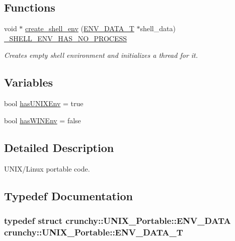 \subsection*{Functions}
\begin{DoxyCompactItemize}
\item 
void $\ast$ \hyperlink{namespacecrunchy_1_1_u_n_i_x___portable_a783c5685096669bb59980444a7c8b37c}{create\+\_\+shell\+\_\+env} (\hyperlink{namespacecrunchy_1_1_u_n_i_x___portable_a200439e6a525bf357a766278278cda8f}{E\+N\+V\+\_\+\+D\+A\+T\+A\+\_\+T} $\ast$shell\+\_\+data) \hyperlink{_c_r_h___signatures_8h_a4cf7ff8aeb847b5144d37bb0f2818387}{\+\_\+\+S\+H\+E\+L\+L\+\_\+\+E\+N\+V\+\_\+\+H\+A\+S\+\_\+\+N\+O\+\_\+\+P\+R\+O\+C\+E\+SS}
\begin{DoxyCompactList}\small\item\em Creates empty shell environment and initializes a thread for it. \end{DoxyCompactList}\end{DoxyCompactItemize}
\subsection*{Variables}
\begin{DoxyCompactItemize}
\item 
bool \hyperlink{namespacecrunchy_1_1_u_n_i_x___portable_a84e6dc3bfb38f92ffc2bb374b3819604}{has\+U\+N\+I\+X\+Env} = true
\item 
bool \hyperlink{namespacecrunchy_1_1_u_n_i_x___portable_a1df8cb012e6cbb395a83d8d965e55ae6}{has\+W\+I\+N\+Env} = false
\end{DoxyCompactItemize}


\subsection{Detailed Description}
U\+N\+I\+X/\+Linux portable code. 

\subsection{Typedef Documentation}
\subsubsection[{E\+N\+V\+\_\+\+D\+A\+T\+A\+\_\+T}]{\setlength{\rightskip}{0pt plus 5cm}typedef struct {\bf crunchy\+::\+U\+N\+I\+X\+\_\+\+Portable\+::\+E\+N\+V\+\_\+\+D\+A\+TA}  {\bf crunchy\+::\+U\+N\+I\+X\+\_\+\+Portable\+::\+E\+N\+V\+\_\+\+D\+A\+T\+A\+\_\+T}}\hypertarget{namespacecrunchy_1_1_u_n_i_x___portable_a200439e6a525bf357a766278278cda8f}{}\label{namespacecrunchy_1_1_u_n_i_x___portable_a200439e6a525bf357a766278278cda8f}


